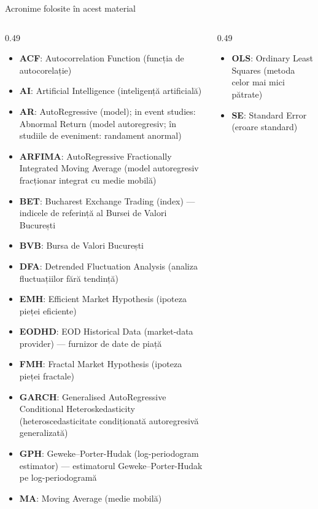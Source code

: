 
{
\begin{frame}[noframenumbering]
    \titlepage
\end{frame}
}
\begin{frame}{Acronime folosite în acest material}
\begin{columns}[T]
\begin{column}{0.49\textwidth}
\begin{itemize}\setlength{\itemsep}{0pt}
    \item \textbf{ACF}: Autocorrelation Function (funcția de autocorelație)
    \item \textbf{AI}: Artificial Intelligence (inteligență artificială)
    \item \textbf{AR}: AutoRegressive (model); in event studies: Abnormal Return (model autoregresiv; în studiile de eveniment: randament anormal)
    \item \textbf{ARFIMA}: AutoRegressive Fractionally Integrated Moving Average (model autoregresiv fracționar integrat cu medie mobilă)
    \item \textbf{BET}: Bucharest Exchange Trading (index) — indicele de referință al Bursei de Valori București
    \item \textbf{BVB}: Bursa de Valori București
    \item \textbf{DFA}: Detrended Fluctuation Analysis (analiza fluctuațiilor fără tendință)
    \item \textbf{EMH}: Efficient Market Hypothesis (ipoteza pieței eficiente)
    \item \textbf{EODHD}: EOD Historical Data (market-data provider) — furnizor de date de piață
    \item \textbf{FMH}: Fractal Market Hypothesis (ipoteza pieței fractale)
    \item \textbf{GARCH}: Generalised AutoRegressive Conditional Heteroskedasticity (heteroscedasticitate condiționată autoregresivă generalizată)
    \item \textbf{GPH}: Geweke–Porter-Hudak (log-periodogram estimator) — estimatorul Geweke–Porter-Hudak pe log-periodogramă
    \item \textbf{MA}: Moving Average (medie mobilă)
\end{itemize}
\end{column}
\begin{column}{0.49\textwidth}
\begin{itemize}\setlength{\itemsep}{0pt}
    \item \textbf{OLS}: Ordinary Least Squares (metoda celor mai mici pătrate)
    \item \textbf{SE}: Standard Error (eroare standard)
\end{itemize}
\end{column}
\end{columns}
\end{frame}

